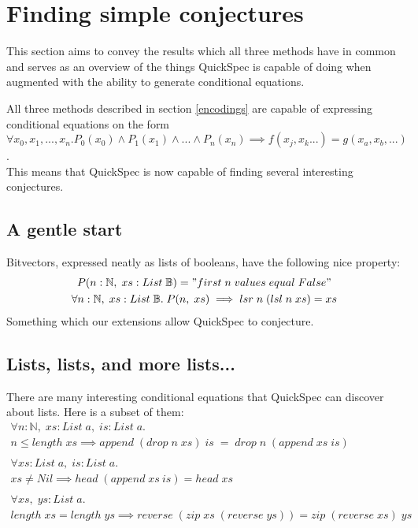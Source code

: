\section{Finding simple conjectures}

This section aims to convey the results which
all three methods have in common and serves as an overview
of the things QuickSpec is capable of doing when augmented with
the ability to generate conditional equations.

All three methods described in section \ref{encodings}
are capable of expressing conditional equations on the form
\\$\forall x_0, x_1, ..., x_n. P_0(x_0) \wedge P_1(x_1) \wedge ... \wedge P_n(x_n) \implies f(x_j, x_k ...) = g(x_a, x_b, ...)$.\\
This means that QuickSpec is now capable of finding several
interesting conjectures.

\subsection{A gentle start} \label{bitvector}
    Bitvectors, expressed neatly as lists of booleans,
    have the following nice property:
    \begin{gather*}
        P(n:\mathbb{N},\;xs:List\;\mathbb{B}) = "first\;n\;values\;equal\;False"\\
        \forall n:\mathbb{N},\;xs:List\;\mathbb{B}.\;P(n,\;xs)\implies lsr\;n\;(lsl\;n\;xs)=xs
    \end{gather*}
    Something which our extensions allow QuickSpec to conjecture.

\subsection{Lists, lists, and more lists...}
    There are many interesting conditional equations that
    QuickSpec can discover about lists. Here is a subset of them:
    \begin{gather*}
        \forall n:\mathbb{N},\; xs:List\; a,\; is:List\; a.\\
        n \leq length\; xs \implies append\; (drop\; n\; xs)\; is\; =\; drop\; n\; (append\; xs\; is)\\\\
        \forall xs:List\; a,\; is:List\; a.\\
        xs \neq Nil \implies head\; (append\; xs\: is) = head\; xs\\\\
        \forall xs,\; ys:List\; a.\\
        length\; xs = length\; ys \implies reverse\; (zip\; xs\; (reverse\; ys)) = zip\; (reverse\; xs)\; ys
    \end{gather*}

